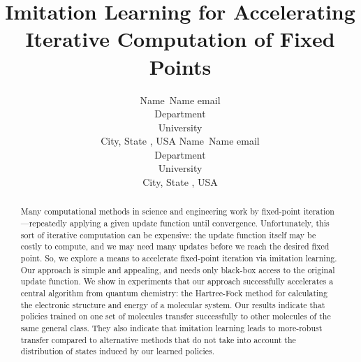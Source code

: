 \documentclass[twoside,11pt]{article}
\begin{document}
\title{Imitation Learning for Accelerating Iterative Computation of Fixed Points}

\author{\name Name\ Name \email email \\
       \addr Department\\
       University \\
       City, State , USA
       \AND
       \name Name\ Name \email email \\
       \addr Department\\
       University \\
       City, State , USA}

\maketitle


\begin{abstract}%
Many computational methods in science and engineering work by fixed-point iteration---repeatedly applying a given update function until convergence.  Unfortunately, this sort of iterative computation can be expensive: the update function itself may be costly to compute, and we may need many updates before we reach the desired fixed point.  So, we explore a means to accelerate fixed-point iteration via imitation learning.  Our approach is simple and appealing, and needs only black-box access to the original update function.  We show in experiments that our approach successfully accelerates a central algorithm from quantum chemistry: the Hartree-Fock method for calculating the electronic structure and energy of a molecular system.  Our results indicate that policies trained on one set of molecules transfer successfully to other molecules of the same general class.  They also indicate that imitation learning leads to more-robust transfer compared to alternative methods that do not take into account the distribution of states induced by our learned policies.
%
\end{abstract}
\end{document}

